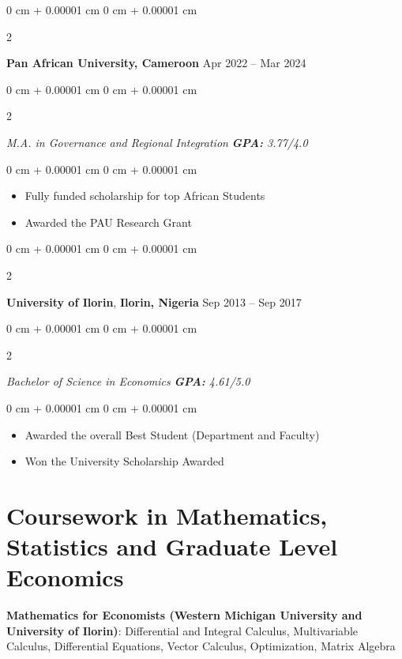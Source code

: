 \documentclass[10pt, letterpaper]{article}
\newenvironment{highlights}{
    \begin{itemize}[
        topsep=0.10 cm,
        parsep=0.10 cm,
        partopsep=0pt,
        itemsep=0pt,
        leftmargin=0 cm + 10pt
    ]
}{
    \end{itemize}
} %
\newenvironment{onecolentry}{
    \begin{adjustwidth}{
        0 cm + 0.00001 cm
    }{
        0 cm + 0.00001 cm
    }
}{
    \end{adjustwidth}
} %
\newenvironment{twocolentry}[2][]{
    \onecolentry
    \def\secondColumn{#2}
    \setcolumnwidth{\fill, 4.5 cm}
    \begin{paracol}{2}
}{
    \switchcolumn \raggedleft \secondColumn
    \end{paracol}
    \endonecolentry
} %
\begin{document}
      \vspace{0.6 cm}  

 \begin{twocolentry}{
            Apr 2022 – Mar 2024
        }
            \textbf{Pan African University, Cameroon}\end{twocolentry}
   
    \begin{twocolentry}{
    \textit{\textbf{GPA:} 3.77/4.0}
    }
    \textit{M.A. in Governance and Regional Integration}\end{twocolentry}
        
  
        \vspace{0.1 cm}
        \begin{onecolentry}
            \begin{highlights}
                \item Fully funded scholarship for top African Students
                \item Awarded the PAU Research Grant
       \end{highlights}
       \end{onecolentry}
    
      \vspace{0.6 cm} 

       \begin{twocolentry}{
            Sep 2013 – Sep 2017
        }
            \textbf{University of Ilorin}, \textbf{Ilorin, Nigeria}\end{twocolentry}
   
    \begin{twocolentry}{
    \textit{\textbf{GPA:} 4.61/5.0}
    }
    \textit{Bachelor of Science in Economics}\end{twocolentry}
        
  
        \vspace{0.10 cm}
        \begin{onecolentry}
            \begin{highlights}
                \item Awarded the overall Best Student (Department and Faculty) 
                \item Won the University Scholarship Awarded
            \end{highlights}
        \end{onecolentry}

    \section{Coursework in Mathematics, Statistics and Graduate Level Economics}
     \textbf{Mathematics for Economists (Western Michigan University and University of Ilorin)}: Differential and Integral Calculus, Multivariable Calculus, Differential Equations, Vector Calculus, Optimization, Matrix Algebra \newline
    
\end{document}
